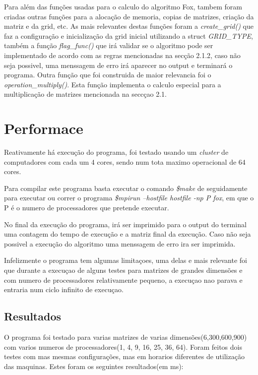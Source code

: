 \documentclass[12pt,a4paper]{article}
\begin{document}
            Para além das funções usadas para o calculo do algoritmo Fox, tambem foram criadas outras funções para a alocação de memoria, copias de matrizes, criação da matriz e da grid, etc. As mais relevantes destas funções foram a \textit{create\_grid()} que faz a configuração e inicialização da grid inicial utilizando a struct \textit{GRID\_TYPE}, também a função \textit{flag\_func()} que irá validar se o algoritmo pode ser implementado de acordo com as regras mencionadas na secção 2.1.2, caso não seja possivel, uma menssagem de erro irá aparecer no output e terminará o programa. Outra função que foi construida de maior relevancia foi o \textit{operation\_multiply()}. Esta função implementa o calculo especial para a multiplicação de matrizes mencionada na seccçao 2.1.
            
        \section{Performace}
            Reativamente há execução do programa, foi testado usando um \textit{cluster} de computadores com cada um 4 cores, sendo num tota maximo operacional de 64 cores. 
            
            Para compilar este programa basta executar o comando \textit{\$make} de seguidamente para executar ou correr o programa \textit{\$mpirun --hostfile hostfile -np P fox}, em que o P é o numero de processadores que pretende executar.
            
            No final da execução do programa, irá ser imprimido para o output do terminal uma contagem do tempo de execução e a matriz final da execução. Caso não seja possivel a execução do algoritmo uma menssagem de erro ira ser imprimida.
            
            Infelizmente o programa tem algumas limitaçoes, uma delas e mais relevante foi que durante a execuçao de alguns testes para matrizes de grandes dimensões e com numero de processadores relativamente pequeno, a execuçao nao parava e entraria num ciclo infinito de execuçao.
            \newline
            \newline
            \newline
            \subsection{Resultados}
                O programa foi testado para varias matrizes de varias dimensões(6,300,600,900) com varios numeros de processadores(1, 4, 9, 16, 25, 36, 64). Foram feitos dois testes com mas mesmas configurações, mas em horarios diferentes de utilização das maquinas.
                Estes foram os seguintes resultados(em ms):\newline
                
\end{document}
